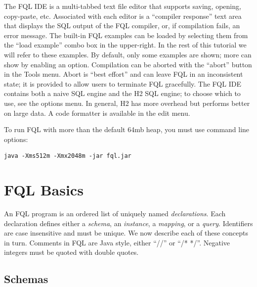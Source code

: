 \documentclass[12pt]{article}
\begin{document}
The FQL IDE is a multi-tabbed text file editor that supports saving, opening, copy-paste, etc.  Associated with each editor is a ``compiler response'' text area that displays the SQL output of the FQL compiler, or, if compilation fails, an error message.  The built-in FQL examples can be loaded by selecting them from the ``load example'' combo box in the upper-right.  In the rest of this tutorial we will refer to these examples.  By default, only some examples are shown; more can show by enabling an option. Compilation can be aborted with the ``abort'' button in the Tools menu.  Abort is ``best effort'' and can leave FQL in an inconsistent state; it is provided to allow users to terminate FQL gracefully.  The FQL IDE contains both a naive SQL engine and the H2 SQL engine; to choose which to use, see the options menu.  In general, H2 has more overhead but performs better on large data. A code formatter is available in the edit menu.

To run FQL with more than the default 64mb heap, you must use command line options:
\begin{verbatim}
java -Xms512m -Xmx2048m -jar fql.jar
\end{verbatim}

\newpage

\section{FQL Basics}

An FQL program is an ordered list of uniquely named {\it declarations}.  Each declaration defines either a {\it schema}, an {\it instance}, a {\it mapping}, or a {\it query}.  Identifiers are case insensitive and must be unique. We now describe each of these concepts in turn.  Comments in FQL are Java style, either ``//'' or ``/* */''. Negative integers must be quoted with double quotes.

\subsection{Schemas}
\end{document}
